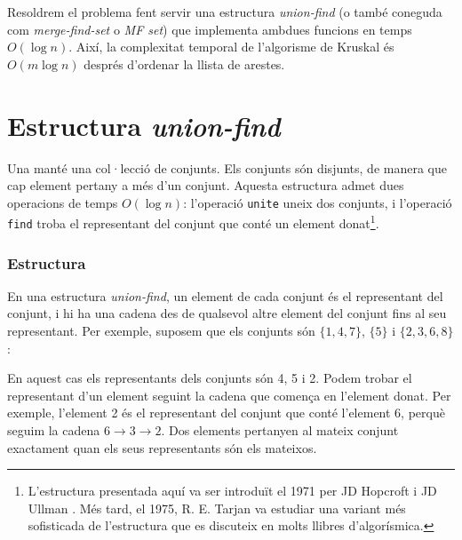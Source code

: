 Resoldrem el problema fent servir una estructura \emph{union-find} (o
també coneguda com \emph{merge-find-set} o \emph{MF set}) que
implementa ambdues funcions en temps $O(\log n)$. Així, la complexitat
temporal de l'algorisme de Kruskal és $O(m \log n)$ després d'ordenar
la llista de arestes.

\section{Estructura \emph{union-find}}


Una  manté una col·lecció de
conjunts. Els conjunts són disjunts, de manera que cap element pertany
a més d'un conjunt. Aquesta estructura admet dues operacions de temps
$O(\log n)$: l'operació \texttt{unite} uneix dos conjunts, i
l'operació \texttt{find} troba el representant del conjunt que conté
un element donat\footnote{L'estructura presentada aquí va ser
introduït el 1971 per JD Hopcroft i JD Ullman \cite{hop71}. Més tard,
el 1975, R. E. Tarjan va estudiar una variant més sofisticada de
l'estructura \cite{tar75} que es discuteix en molts llibres
d'algorísmica.}.

\subsubsection{Estructura}

En una estructura \emph{union-find}, un element de cada conjunt és el
representant del conjunt, i hi ha una cadena des de qualsevol altre
element del conjunt fins al seu representant. Per exemple, suposem que
els conjunts són $\{1,4,7\}$, $\{5\}$ i $\{2,3,6,8\}$:
\begin{center}
\end{center}
En aquest cas els representants dels conjunts són 4, 5 i 2. Podem
trobar el representant d'un element seguint la cadena que
comença en l'element donat. Per exemple, l'element 2 és el representant del conjunt
que conté l'element 6, perquè seguim la cadena $6 \rightarrow 3 \rightarrow
2$. Dos elements pertanyen al mateix conjunt exactament quan els seus
representants són els mateixos.

